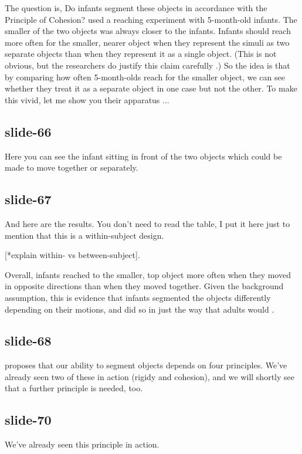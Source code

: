 \documentclass[12pt,\papersize]{extarticle}
\begin{document}
The question is, Do infants segment these objects in accordance with the Principle of Cohesion?
\citet[Experiment 2]{spelke:1989_reaching} used a reaching experiment with 5-month-old infants.
The smaller of the two objects was always closer to the infants.  
Infants should reach more often for the smaller, nearer object when they represent the simuli 
as two separate objects than when they represent it as a single object.
(This is not obvious, but the researchers do justify this claim carefully 
\citep[p.\ 186]{spelke:1989_reaching}.)
So the idea is that by comparing how often 5-month-olds reach for the smaller object, we can
see whether they treat it as a separate object in one case but not the other.
To make this vivid, let me show you their apparatus ...
 
\subsection{slide-66}
Here you can see the infant sitting in front of the two objects which could be made to move
together or separately.
 
\subsection{slide-67}
And here are the results.  You don't need to read the table, I put it here just to mention
that this is a within-subject design.

[*explain within- vs between-subject].

Overall, infants reached to the smaller, top object more often when they moved in opposite 
directions than when they moved together.
Given the background assumption, this is evidence that infants segmented the objects 
differently depending on their motions, and did so in just the way that adults would
\citep[Experiment 2]{spelke:1989_reaching}.
 
\subsection{slide-68}
\citet{Spelke:1990jn} proposes that our ability to segment objects depends on four principles.
We've already seen two of these in action (rigidy and cohesion), and we will shortly see 
that a further principle is needed, too.
 
\subsection{slide-70}
We've already seen this principle in action.
 
\end{document}
